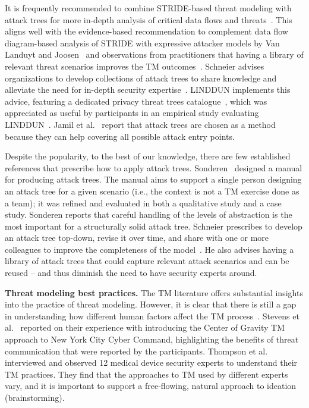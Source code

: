 It is frequently recommended to combine STRIDE-based threat modeling with attack trees for more in-depth analysis of critical data flows and threats~\cite{shostack2014threat,tarandach2020threat,reversinglabs2024attacktrees}. This aligns well with the evidence-based recommendation to complement data flow diagram-based analysis of STRIDE with expressive attacker models by Van Landuyt and Joosen~\cite{van2022descriptivestride} and observations from practitioners that having a library of relevant threat scenarios improves the TM outcomes~\cite{dhillon2011developer}. Schneier advises organizations to develop collections of attack trees to share knowledge and alleviate the need for in-depth security expertise~\cite{schneierAttackTrees1999}. LINDDUN implements this advice, featuring a dedicated privacy threat trees catalogue~\cite{deng2011privacy}, which was appreciated as useful by participants in an empirical study evaluating LINDDUN~\cite{wuyts2014empirical}. Jamil et al.~\cite{jamil2021threat} report that attack trees are chosen as a method because they can help covering all possible attack entry points. 

Despite the popularity, to the best of our knowledge, there are few established references that prescribe how to apply attack trees. Sonderen~\cite{sonderenManualAttackTrees2019} designed a manual for producing attack trees. The manual aims to support a single person designing an attack tree for a given scenario (i.e., the context is not a TM exercise done as a team); it was refined and evaluated in both a qualitative study and a case study. Sonderen reports that careful handling of the levels of abstraction is the most important for a structurally solid attack tree. Schneier prescribes to develop an attack tree top-down, revise it over time, and share with one or more colleagues to improve the completeness of the model~\cite{schneierAttackTrees1999}. He also advises having a library of attack trees that could capture relevant attack scenarios and can be reused -- and thus diminish the need to have security experts around. 


\textbf{Threat modeling best practices.}
The TM literature offers substantial insights into the practice of threat modeling. However, it is clear that there is still a gap in understanding how different human factors affect the TM process~\cite{tran2023threat}.
Stevens et al.~\cite{stevens2018battle} reported on their experience with introducing the Center of Gravity TM approach to New York City Cyber Command, highlighting the benefits of threat communication that were reported by the participants. Thompson et al.~\cite{thompson2024there} interviewed and observed 12 medical device security experts to understand their TM practices. They find that the approaches to TM used by different experts vary, and it is important to support a free-flowing, natural approach to ideation (brainstorming).  

